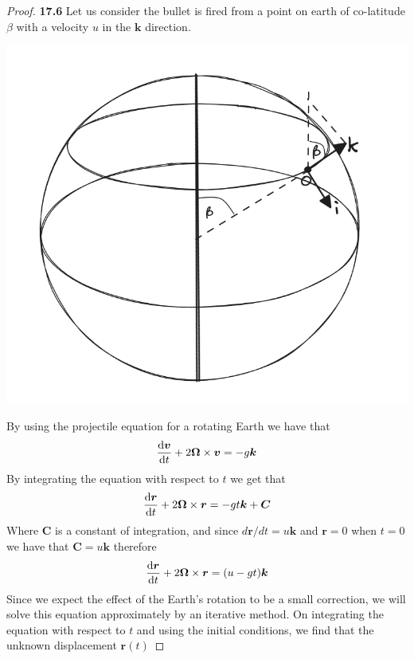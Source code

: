 \documentclass[11pt]{article}
\theoremstyle{definition}
\begin{document}
\begin{proof}{\textbf{17.6}}
    Let us consider the bullet is fired from a point on earth of co-latitude
    $\beta$ with a velocity $u$ in the $\bm{k}$ direction. 
    \begin{center}
        \includegraphics[scale=0.4]{ch17-6.png}
    \end{center}
    By using the projectile equation for a rotating Earth we have that
    \begin{align*}
        \derivative{\bm v}{t} + 2\bm{\Omega}\times \bm v = -g\bm{k}
    \end{align*}
    By integrating the equation with respect to $t$ we get that
    \begin{align*}
        \derivative{\bm r}{t} + 2\bm{\Omega}\times \bm{r} = -gt\bm{k}  + \bm{C}
    \end{align*}
    Where $\bm{C}$ is a constant of integration, and since
    $d\bm{r}/dt = u\bm{k}$ and $\bm{r} = 0$ when $t = 0$ we have that
    $\bm{C} = u\bm{k}$ therefore
    \begin{align*}
        \derivative{\bm r}{t} + 2\bm{\Omega}\times \bm{r} = (u - gt)\bm{k}
    \end{align*}
    Since we expect the effect of the Earth's rotation to be a small correction,
    we will solve this equation approximately by an iterative method.
    On integrating the equation with respect to $t$ and using the 
    initial conditions, we ﬁnd that the unknown displacement $\bm{r}(t)$

\end{proof}
\end{document}
